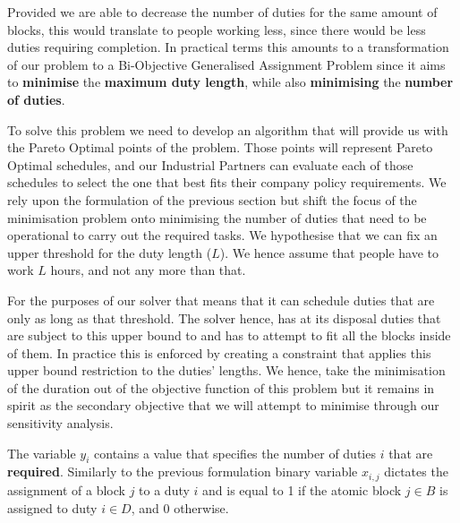 \vspace{\baselineskip}
\noindent
Provided we are able to decrease the number of duties for the same amount of blocks, this would translate to people working less, since there would be less duties requiring completion. In practical terms this amounts to a transformation of our problem to a Bi-Objective Generalised Assignment Problem \cite{PRAKASH2010} since it aims to \textbf{minimise} the \textbf{maximum duty length}, while also \textbf{minimising} the \textbf{number of duties}. 

\vspace{\baselineskip}
\noindent
To solve this problem we need to develop an algorithm that will provide us with the Pareto Optimal points of the problem. Those points will represent Pareto Optimal schedules, and our Industrial Partners can evaluate each of those schedules to select the one that best fits their company policy requirements. We rely upon the formulation of the previous section but shift the focus of the minimisation problem onto minimising the number of duties that need to be operational to carry out the required tasks. We hypothesise that we can fix an upper threshold for the duty length ($L$). We hence assume that people have to work $L$ hours, and not any more than that. 

\vspace{\baselineskip}
\noindent
For the purposes of our solver that means that it can schedule duties that are only as long as that threshold. The solver hence, has at its disposal duties that are subject to this upper bound to and has to attempt to fit all the blocks inside of them. In practice this is enforced by creating a constraint that applies this upper bound restriction to the duties' lengths. We hence, take the minimisation of the duration out of the objective function of this problem but it remains in spirit as the secondary objective that we will attempt to minimise through our sensitivity analysis.

\vspace{\baselineskip}
\noindent
The variable $y_{i}$ contains a value that specifies the number of duties $i$ that are \textbf{required}. Similarly to the previous formulation binary variable $x_{i,j}$ dictates the assignment of a block $j$ to a duty $i$ and is equal to 1 if the atomic block $j \in B$ is assigned to duty $i \in D$, and 0 otherwise.


